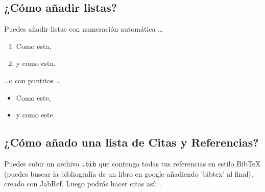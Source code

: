 \documentclass[a4paper]{article}
\begin{document}
\subsection{¿Cómo añadir listas?}

Puedes añadir listas con numeración automática \dots

\begin{enumerate}
\item Como esta,
\item y como esta.
\end{enumerate}
\dots o con puntitos \dots
\begin{itemize}
\item Como este,
\item y como este.
\end{itemize}

\subsection{¿Cómo añado una lista de Citas y Referencias?}

Puedes subir un archivo \verb|.bib| que contenga todas tus referencias en estilo BibTeX (puedes buscar la bibliografía de un libro en google añadiendo 'bibtex' al final), creado con JabRef. Luego podrás hacer citas así: \cite{Griffiths:1492149}.



\end{document}
